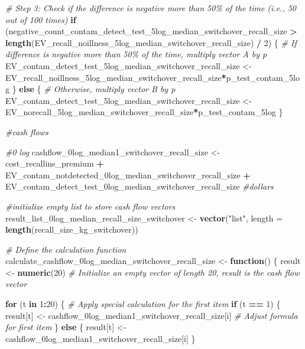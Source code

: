 \documentclass[
]{article}
\newenvironment{Shaded}{\begin{snugshade}}{\end{snugshade}}
\newcommand{\AttributeTok}[1]{\textcolor[rgb]{0.13,0.29,0.53}{#1}}
\newcommand{\CommentTok}[1]{\textcolor[rgb]{0.56,0.35,0.01}{\textit{#1}}}
\newcommand{\ControlFlowTok}[1]{\textcolor[rgb]{0.13,0.29,0.53}{\textbf{#1}}}
\newcommand{\DecValTok}[1]{\textcolor[rgb]{0.00,0.00,0.81}{#1}}
\newcommand{\FunctionTok}[1]{\textcolor[rgb]{0.13,0.29,0.53}{\textbf{#1}}}
\newcommand{\NormalTok}[1]{#1}
\newcommand{\OtherTok}[1]{\textcolor[rgb]{0.56,0.35,0.01}{#1}}
\newcommand{\SpecialCharTok}[1]{\textcolor[rgb]{0.81,0.36,0.00}{\textbf{#1}}}
\newcommand{\StringTok}[1]{\textcolor[rgb]{0.31,0.60,0.02}{#1}}
\begin{document}
\begin{Shaded}
\begin{Highlighting}[]
\CommentTok{\# Step 3: Check if the difference is negative more than 50\% of the time (i.e., 50 out of 100 times)}
\ControlFlowTok{if}\NormalTok{ (negative\_count\_contam\_detect\_test\_5log\_median\_switchover\_recall\_size }\SpecialCharTok{\textgreater{}} \FunctionTok{length}\NormalTok{(EV\_recall\_noillness\_5log\_median\_switchover\_recall\_size) }\SpecialCharTok{/} \DecValTok{2}\NormalTok{) \{}
  \CommentTok{\# If difference is negative more than 50\% of the time, multiply vector A by p}
\NormalTok{  EV\_contam\_detect\_test\_5log\_median\_switchover\_recall\_size }\OtherTok{\textless{}{-}}\NormalTok{ EV\_recall\_noillness\_5log\_median\_switchover\_recall\_size}\SpecialCharTok{*}\NormalTok{p\_test\_contam\_5log}
\NormalTok{\} }\ControlFlowTok{else}\NormalTok{ \{}
  \CommentTok{\# Otherwise, multiply vector B by p}
\NormalTok{ EV\_contam\_detect\_test\_5log\_median\_switchover\_recall\_size  }\OtherTok{\textless{}{-}}\NormalTok{ EV\_norecall\_5log\_median\_switchover\_recall\_size}\SpecialCharTok{*}\NormalTok{p\_test\_contam\_5log}
\NormalTok{\}}



\CommentTok{\#cash flows}

\CommentTok{\#0 log}
\NormalTok{cashflow\_0log\_median1\_switchover\_recall\_size }\OtherTok{\textless{}{-}}\NormalTok{ cost\_recallins\_premium }\SpecialCharTok{+}\NormalTok{ EV\_contam\_notdetected\_0log\_median\_switchover\_recall\_size }\SpecialCharTok{+}\NormalTok{ EV\_contam\_detect\_test\_0log\_median\_switchover\_recall\_size }\CommentTok{\#dollars}


\CommentTok{\#initialize empty list to store cash flow vectors}
\NormalTok{result\_list\_0log\_median\_recall\_size\_switchover }\OtherTok{\textless{}{-}} \FunctionTok{vector}\NormalTok{(}\StringTok{"list"}\NormalTok{, }\AttributeTok{length =} \FunctionTok{length}\NormalTok{(recall\_size\_kg\_switchover))}


\CommentTok{\# Define the calculation function}
\NormalTok{calculate\_cashflow\_0log\_median\_switchover\_recall\_size }\OtherTok{\textless{}{-}} \ControlFlowTok{function}\NormalTok{() \{}
\NormalTok{  result }\OtherTok{\textless{}{-}} \FunctionTok{numeric}\NormalTok{(}\DecValTok{20}\NormalTok{)  }\CommentTok{\# Initialize an empty vector of length 20, result is the cash flow vector}
  
  \ControlFlowTok{for}\NormalTok{ (t }\ControlFlowTok{in} \DecValTok{1}\SpecialCharTok{:}\DecValTok{20}\NormalTok{) \{}
    \CommentTok{\# Apply special calculation for the first item}
    \ControlFlowTok{if}\NormalTok{ (t }\SpecialCharTok{==} \DecValTok{1}\NormalTok{) \{}
\NormalTok{      result[t] }\OtherTok{\textless{}{-}}\NormalTok{ cashflow\_0log\_median1\_switchover\_recall\_size[i] }\CommentTok{\# Adjust formula for first item}
\NormalTok{    \} }\ControlFlowTok{else}\NormalTok{ \{}
\NormalTok{      result[t] }\OtherTok{\textless{}{-}}\NormalTok{ cashflow\_0log\_median1\_switchover\_recall\_size[i]}
\NormalTok{    \}}
    

\end{Highlighting}
\end{Shaded}
\end{document}
